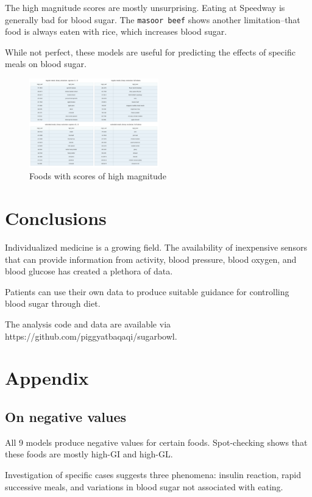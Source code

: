 \documentclass[conference]{IEEEtran}
\begin{document}
The high magnitude scores are mostly unsurprising. Eating at Speedway is generally bad for blood sugar. The \texttt{masoor beef} shows another limitation--that food is always eaten with rice, which increases blood sugar.

While not perfect, these models are useful for predicting the effects of specific meals on blood sugar.

\begin{figure}[tbp]
    \includegraphics[width=0.5\textwidth]{images/high_gplus_best_models.png}
    \caption{Foods with scores of high magnitude}
    \label{fig:high_best}
\end{figure}

\section{Conclusions}

Individualized medicine is a growing field. The availability of inexpensive sensors that can provide information from activity, blood pressure, blood oxygen, and blood glucose has created a plethora of data.

Patients can use their own data to produce suitable guidance for controlling blood sugar through diet.

The analysis code and data are available via https://github.com/piggyatbaqaqi/sugarbowl.

\section*{Appendix}

\subsection{On negative values}

All 9 models produce negative values for certain foods. Spot-checking shows that these foods are mostly high-GI and high-GL.

Investigation of specific cases suggests three phenomena: insulin reaction, rapid successive meals, and variations in blood sugar not associated with eating.
\end{document}
